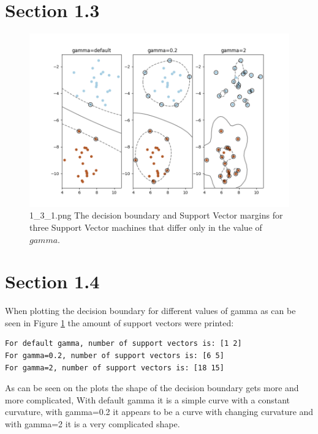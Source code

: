 \documentclass{article}
\begin{document}
\section*{Section 1.3}
\begin{figure}[H]
    \centering
    \includegraphics[width=\textwidth]{08_SVM/1_3_1.png}
    \caption{1\_3\_1.png The decision boundary and Support Vector margins for three Support Vector machines that differ only in the value of $gamma$.}
    \label{fig:section13}
\end{figure}

\section*{Section 1.4}
When plotting the decision boundary for different values of gamma as can be seen in Figure \ref{fig:section13} the amount of support vectors were printed:
\begin{verbatim}
For default gamma, number of support vectors is: [1 2]
For gamma=0.2, number of support vectors is: [6 5]
For gamma=2, number of support vectors is: [18 15]
\end{verbatim}

As can be seen on the plots the shape of the decision boundary gets more and more complicated, With default gamma it is a simple curve with a constant curvature, with gamma=0.2 it appears to be a curve with changing curvature and with gamma=2 it is a very complicated shape.
\end{document}
